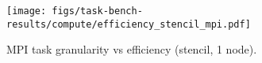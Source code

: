\begin{figure}[t]
\centering
\texttt{[image: figs/task-bench-results/compute/efficiency\_stencil\_mpi.pdf]}
\caption{MPI task granularity vs efficiency (stencil, 1 node).\label{fig:efficiency-mpi}}
\end{figure}
